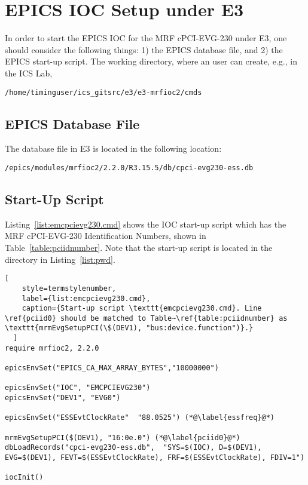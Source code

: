 \documentclass[11pt
  , a4paper
  , article
  , oneside
  , showtrims
]{memoir}
\begin{document}
\clearpage
\section{EPICS IOC Setup under E3}
In order to start the EPICS IOC for the MRF cPCI-EVG-230 under E3, one should consider the following things: 1) the EPICS database file, and 2) the EPICS start-up script. The working directory, where an user can create, e.g., in the ICS Lab,
\begin{lstlisting}[style=termstyle, label={list:pwd}, caption={Working Directory in the ICS lab.} ]
/home/timinguser/ics_gitsrc/e3/e3-mrfioc2/cmds
\end{lstlisting}

\subsection{EPICS Database File}
The database file in E3 is located in the following location:
\begin{lstlisting}[style=termstyle]
/epics/modules/mrfioc2/2.2.0/R3.15.5/db/cpci-evg230-ess.db
\end{lstlisting}


\subsection{Start-Up Script}
Listing~\ref{list:emcpcievg230.cmd} shows the IOC start-up script which has the MRF cPCI-EVG-230 Identification Numbers, shown in Table~\ref{table:pciidnumber}. Note that the start-up script is located in the directory in Listing~\ref{list:pwd}.

\begin{lstlisting}[
    style=termstylenumber,
    label={list:emcpcievg230.cmd},
    caption={Start-up script \texttt{emcpcievg230.cmd}. Line \ref{pciid0} should be matched to Table~\ref{table:pciidnumber} as \texttt{mrmEvgSetupPCI(\$(DEV1), "bus:device.function")}.}
  ]
require mrfioc2, 2.2.0

epicsEnvSet("EPICS_CA_MAX_ARRAY_BYTES","10000000")

epicsEnvSet("IOC", "EMCPCIEVG230")
epicsEnvSet("DEV1", "EVG0")

epicsEnvSet("ESSEvtClockRate"  "88.0525") (*@\label{essfreq}@*)

mrmEvgSetupPCI($(DEV1), "16:0e.0") (*@\label{pciid0}@*)
dbLoadRecords("cpci-evg230-ess.db",  "SYS=$(IOC), D=$(DEV1), EVG=$(DEV1), FEVT=$(ESSEvtClockRate), FRF=$(ESSEvtClockRate), FDIV=1")

iocInit()
\end{lstlisting}
\end{document}

